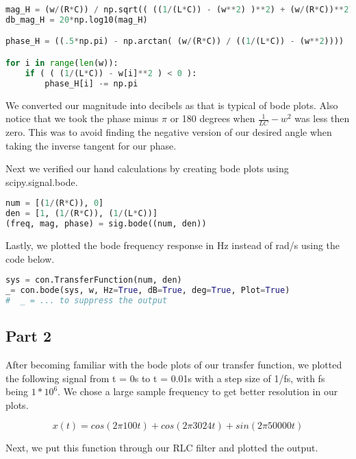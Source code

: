 \documentclass[12pt]{report}
\begin{document}
\begin{lstlisting}[language= Python, caption = Hand calculated magnitude and phase]
mag_H = (w/(R*C)) / np.sqrt(( ((1/(L*C)) - (w**2) )**2) + (w/(R*C))**2)
db_mag_H = 20*np.log10(mag_H)

phase_H = ((.5*np.pi) - np.arctan( (w/(R*C)) / ((1/(L*C)) - (w**2)))) 

for i in range(len(w)):
    if ( ( (1/(L*C)) - w[i]**2 ) < 0 ):
        phase_H[i] -= np.pi
\end{lstlisting}

\vspace{1cm}
We converted our magnitude into decibels as that is typical of bode plots. Also notice that we took the phase minus $\pi$ or 180 degrees when $\frac{1}{LC} - w^{2}$ was less then zero. This was to avoid finding the negative version of our desired angle when taking the inverse tangent for our phase. 

Next we verified our hand calculations by creating bode plots using scipy.signal.bode. 

\begin{lstlisting}[language= Python, caption = Magnitude and phase using sig.bode]
num = [(1/(R*C)), 0]
den = [1, (1/(R*C)), (1/(L*C))]
(freq, mag, phase) = sig.bode((num, den))
\end{lstlisting}
\vspace{1cm}
Lastly, we plotted the bode frequency response in Hz instead of rad/s using the code below. 

\begin{lstlisting}[language= Python, caption = Frequency response in Hz]
sys = con.TransferFunction(num, den)
_= con.bode(sys, w, Hz=True, dB=True, deg=True, Plot=True)
#  _ = ... to suppress the output
\end{lstlisting}
\vspace{1cm}
\vspace{-0.5cm}
\subsection*{Part 2}
\setlength{\parindent}{5ex}
After becoming familiar with the bode plots of our transfer function, we plotted the following signal from t = 0s to t = 0.01s with a step size of 1/fs, with fs being $1*10^{6}$. We chose a large sample frequency to get better resolution in our plots. 

$$x(t) = cos(2\pi100t) + cos(2\pi3024t) + sin(2\pi50000t)$$

Next, we put this function through our RLC filter and plotted the output.
\end{document}

